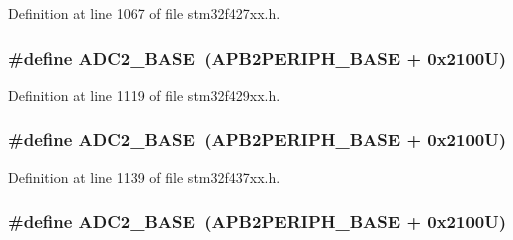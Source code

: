 Definition at line 1067 of file stm32f427xx.\+h.

\subsubsection[{\texorpdfstring{A\+D\+C2\+\_\+\+B\+A\+SE}{ADC2_BASE}}]{\setlength{\rightskip}{0pt plus 5cm}\#define A\+D\+C2\+\_\+\+B\+A\+SE~({\bf A\+P\+B2\+P\+E\+R\+I\+P\+H\+\_\+\+B\+A\+SE} + 0x2100\+U)}\hypertarget{group___peripheral__memory__map_ga6544abc57f9759f610eee09a02442ae6}{}\label{group___peripheral__memory__map_ga6544abc57f9759f610eee09a02442ae6}


Definition at line 1119 of file stm32f429xx.\+h.

\subsubsection[{\texorpdfstring{A\+D\+C2\+\_\+\+B\+A\+SE}{ADC2_BASE}}]{\setlength{\rightskip}{0pt plus 5cm}\#define A\+D\+C2\+\_\+\+B\+A\+SE~({\bf A\+P\+B2\+P\+E\+R\+I\+P\+H\+\_\+\+B\+A\+SE} + 0x2100\+U)}\hypertarget{group___peripheral__memory__map_ga6544abc57f9759f610eee09a02442ae6}{}\label{group___peripheral__memory__map_ga6544abc57f9759f610eee09a02442ae6}


Definition at line 1139 of file stm32f437xx.\+h.

\subsubsection[{\texorpdfstring{A\+D\+C2\+\_\+\+B\+A\+SE}{ADC2_BASE}}]{\setlength{\rightskip}{0pt plus 5cm}\#define A\+D\+C2\+\_\+\+B\+A\+SE~({\bf A\+P\+B2\+P\+E\+R\+I\+P\+H\+\_\+\+B\+A\+SE} + 0x2100\+U)}\hypertarget{group___peripheral__memory__map_ga6544abc57f9759f610eee09a02442ae6}{}\label{group___peripheral__memory__map_ga6544abc57f9759f610eee09a02442ae6}


